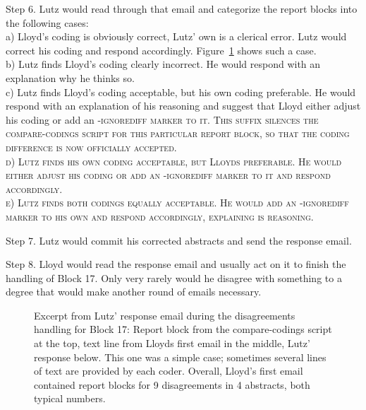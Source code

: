 \documentclass[10pt,journal,compsoc]{IEEEtran}
\newcommand{\Cb}[1]{\bgroup\scshape #1\egroup}  %
\newcommand{\Prg}[1]{\bgroup\ttfamily #1\egroup}  %
\begin{document}
Step 6. Lutz would read through that email and categorize the report blocks into the following cases:\\
a) Lloyd's coding is obviously correct, Lutz' own is a clerical error.
Lutz would correct his coding and respond accordingly.
Figure~\ref{email-MeyAlmKel22.png} shows such a case.\\
b) Lutz finds Lloyd's coding clearly incorrect. 
He would respond with an explanation why he thinks so.\\
c) Lutz finds Lloyd's coding acceptable, but his own coding preferable.
He would respond with an explanation of his reasoning and suggest that Lloyd
either adjust his coding or add an \Cb{-ignorediff} marker to it.
This suffix silences the \Prg{compare-codings} script for this particular report block,
so that the coding difference is now officially accepted.\\
d) Lutz finds his own coding acceptable, but Lloyds preferable.
He would either adjust his coding or add an \Cb{-ignorediff} marker to it
and respond accordingly.\\
e) Lutz finds both codings equally acceptable.
He would add an \Cb{-ignorediff} marker to his own
and respond accordingly, explaining is reasoning.

Step 7. Lutz would commit his corrected abstracts and send the response email.

Step 8. Lloyd would read the response email and usually act on it to finish the handling of 
Block 17.
Only very rarely would he disagree with something to a degree that would make
another round of emails necessary.

\begin{figure}[tbp]%
	\centering{}%
	\vspace{-2mm}\caption{Excerpt from Lutz' response email during the disagreements handling
		for Block 17: 
		Report block from the \Prg{compare-codings} script at the top,
		text line from Lloyds first email in the middle,
		Lutz' response below.
		This one was a simple case; 
		sometimes several lines of text are provided by each coder.
		Overall, Lloyd's first email contained report blocks for 9 disagreements
		in 4 abstracts, both typical numbers.}\label{email-MeyAlmKel22.png}%
\end{figure}
\end{document}
